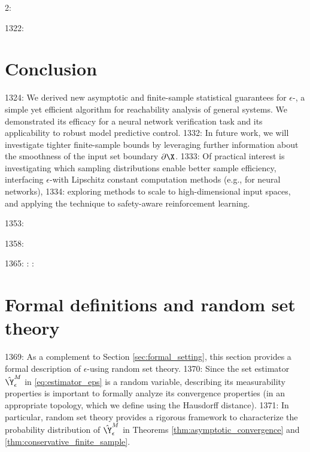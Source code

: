 2: \documentclass[12pt]{l4dc2022} %
\begin{document}
1322: \section{Conclusion}
1324: We derived new asymptotic and finite-sample statistical guarantees for $\epsilon$-\randup, a simple yet efficient algorithm for reachability analysis of general systems. We demonstrated its efficacy for a neural network verification task and its applicability to robust model predictive control. 
1332: In future work, we will investigate tighter finite-sample bounds by leveraging further information about the smoothness of the input set boundary $\partial\X$. 
1333: Of practical interest is investigating which sampling distributions enable better sample efficiency, interfacing $\epsilon$-\randup with Lipschitz constant computation methods (e.g., \citep{Fazlyab2019} for neural networks), 
1334: exploring  methods to scale to high-dimensional input spaces, and applying the technique to safety-aware reinforcement learning.

1353: 

1358: 

1365: : : \section{Formal definitions and random set theory}\label{apdx:random_set_theory}

1369: As a complement to Section \ref{sec:formal_setting}, this section provides a formal description of $\epsilon$-\randup using random set theory. 
1370: Since the set estimator $\hat\Y^M_{\epsilon}$ in \eqref{eq:estimator_eps} is a random variable, describing its measurability properties is important to formally analyze its convergence properties (in an appropriate topology, which we define using the Hausdorff distance). 
1371: In particular, random set theory provides a rigorous framework to characterize the probability distribution of $\hat\Y^M_{\epsilon}$ in Theorems \ref{thm:asymptotic_convergence} and \ref{thm:conservative_finite_sample}. 
\end{document}
